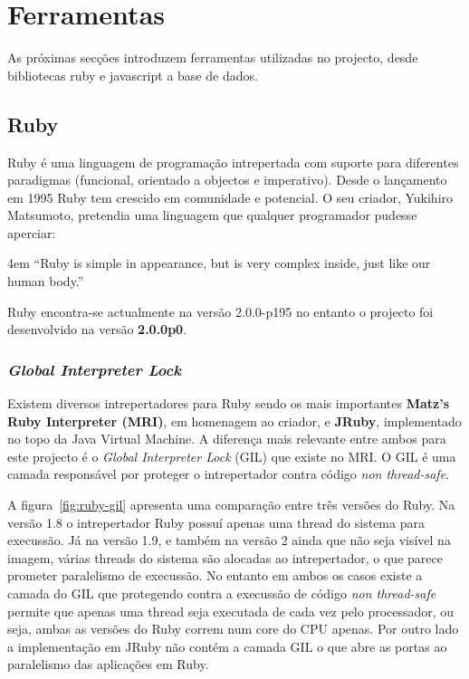 \section{Ferramentas}

As próximas secções introduzem ferramentas utilizadas no projecto, desde bibliotecas ruby e javascript a base de dados.

\subsection{Ruby}
\label{sec:ruby}

Ruby é uma linguagem de programação intrepertada com suporte para diferentes paradigmas (funcional, orientado a objectos e imperativo). Desde o lançamento em 1995 Ruby tem crescido em comunidade e potencial. O seu criador, Yukihiro Matsumoto, pretendia uma linguagem que qualquer programador pudesse aperciar:

\begingroup
\leftskip4em
\rightskip\leftskip
``Ruby is simple in appearance, but is very complex inside, just like our human body.'' \cite{matz}
\par
\endgroup

Ruby encontra-se actualmente na versão 2.0.0-p195 no entanto o projecto foi desenvolvido na versão \textbf{2.0.0p0}.

\subsubsection{\textit{Global Interpreter Lock}}
\label{sec:gil}

Existem diversos intrepertadores para Ruby sendo os mais importantes \textbf{Matz's Ruby Interpreter (MRI)}, em homenagem ao criador, e \textbf{JRuby}, implementado no topo da Java Virtual Machine.
A diferença mais relevante entre ambos para este projecto é o \textit{Global Interpreter Lock} (GIL) que existe no MRI. O GIL é uma camada responsável por proteger o intrepertador contra código \textit{non thread-safe}.

A figura~\ref{fig:ruby-gil} apresenta uma comparação entre três versões do Ruby. Na versão 1.8 o intrepertador Ruby possuí apenas uma thread do sistema para execussão. Já na versão 1.9, e também na versão 2 ainda que não seja visível na imagem, várias threads do sistema são alocadas ao intrepertador, o que parece prometer paralelismo de execussão. No entanto em ambos os casos existe a camada do GIL que protegendo contra a execussão de código \textit{non thread-safe} permite que apenas uma thread seja executada de cada vez pelo processador, ou seja, ambas as versões do Ruby correm num core do CPU apenas.
Por outro lado a implementação em JRuby não contém a camada GIL o que abre as portas ao paralelismo das aplicações em Ruby.

